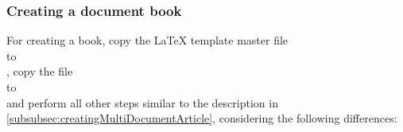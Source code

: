 \subsubsection[A \multidoc document book]{Creating a \multidoc document book}
\label{subsubsec:creatingMultiDocumentBook}

For creating a \multidoc book, copy the \LaTeX{} template master file \\
 to \\
, copy the file \\
 to \\
and perform all other steps similar to the description in
\autoref{subsubsec:creatingMultiDocumentArticle}, considering the following
differences:
